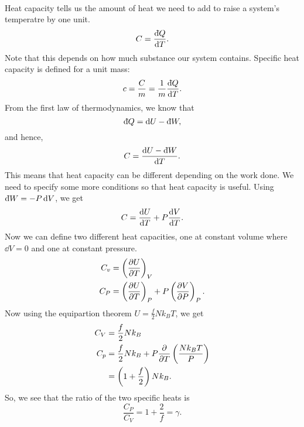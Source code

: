 \documentclass[../thermodynamics.tex]{subfiles}
\begin{document}
        \paragraph{}
        Heat capacity tells us the amount of heat we need to add to raise a system's temperatre by one unit.
        \begin{equation}
            C=\frac{\dbar{Q}}{\dd{T}}.
        \end{equation}
        Note that this depends on how much substance our system contains.
        Specific heat capacity is defined for a unit mass:
        \begin{equation}
            c=\frac{C}{m}=\frac{1}{m}\frac{\dbar{Q}}{\dd{T}}.
        \end{equation}
        From the first law of thermodynamics, we know that
        \begin{equation}
            \dbar{Q}=\dd{U}-\dbar{W},
        \end{equation}
        and hence,
        \begin{equation}
            C=\frac{\dd{U}-\dbar{W}}{\dd{T}}.
        \end{equation}
        This means that heat capacity can be different depending on the work done.
        We need to specify some more conditions so that heat capacity is useful.
        Using $\dbar{W}=-P\dd{V}$, we get
        \begin{equation}
            C=\dv{U}{T}+P\dv{V}{T}.
        \end{equation}
        Now we can define two different heat capacities, one at constant volume where $\dd{V}=0$ and one at constant pressure.
        \begin{align}
            C_v&=\left(\pdv{U}{T}\right)_V\\
            C_P&=\left(\pdv{U}{T}\right)_P+P\left(\pdv{V}{P}\right)_P.
        \end{align}
        Now using the equipartion theorem $U=\frac{f}{2}Nk_BT$, we get
        \begin{align}
            C_V&=\frac{f}{2}Nk_B\\
            C_p&=\frac{f}{2}Nk_B+P\pdv{}{T}\left(\frac{Nk_BT}{P}\right)\\
            &=\left(1+\frac{f}{2}\right)Nk_B.
        \end{align}
        So, we see that the ratio of the two specific heats is
        \begin{equation}
            \frac{C_P}{C_V}=1+\frac{2}{f}=\gamma.
        \end{equation}
\end{document}
